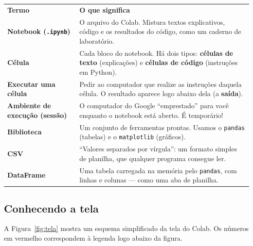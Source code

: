 \documentclass[11pt,a4paper]{article}
\newcommand{\cabecalho}{\rowcolor{azul}}
\newcommand{\cab}[1]{\leavevmode\color{white}\bfseries #1}
\begin{document}
\begin{center}
\small
\renewcommand{\arraystretch}{1.45}
\begin{tabularx}{\linewidth}{>{\raggedright\arraybackslash\bfseries\leavevmode\color{azul}}p{4.1cm}Y}
\cabecalho \cab{Termo} & \cab{O que significa} \\
Notebook (\texttt{.ipynb}) & O arquivo do Colab. Mistura textos explicativos, código e os resultados do código, como um caderno de laboratório. \\
Célula & Cada bloco do notebook. Há dois tipos: \textbf{células de texto} (explicações) e \textbf{células de código} (instruções em Python). \\
Executar uma célula & Pedir ao computador que realize as instruções daquela célula. O resultado aparece logo abaixo dela (a \textbf{saída}). \\
Ambiente de execução (sessão) & O computador do Google ``emprestado'' para você enquanto o notebook está aberto. É temporário! \\
Biblioteca & Um conjunto de ferramentas prontas. Usamos o \texttt{pandas} (tabelas) e o \texttt{matplotlib} (gráficos). \\
CSV & ``Valores separados por vírgula'': um formato simples de planilha, que qualquer programa consegue ler. \\
DataFrame & Uma tabela carregada na memória pelo \texttt{pandas}, com linhas e colunas --- como uma aba de planilha. \\
\end{tabularx}
\end{center}

\subsection{Conhecendo a tela}\label{sec:tela}

A Figura~\ref{fig:tela} mostra um esquema simplificado da tela do Colab. Os números em vermelho correspondem à legenda logo abaixo da figura.
\end{document}
